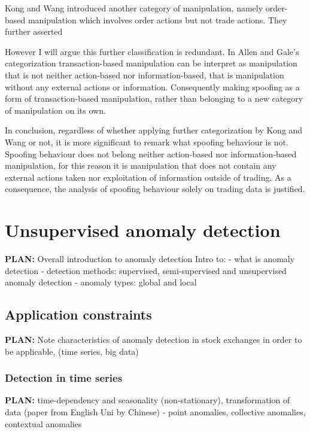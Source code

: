 \documentclass{tut-thesis}
\begin{document}
Kong and Wang \cite*{KongWang2013} introduced another category of manipulation, namely order-based manipulation which involves order actions but not trade actions. They further asserted 

However I will argue this further classification is redundant. In Allen and Gale's categorization transaction-based manipulation can be interpret as manipulation that is not neither action-based nor information-based, that is manipulation without any external actions or information. Consequently making spoofing as a form of transaction-based manipulation, rather than belonging to a new category of manipulation on its own.

In conclusion, regardless of whether applying further categorization by Kong and Wang or not, it is more significant to remark what spoofing behaviour is not. Spoofing behaviour does not belong neither action-based nor information-based manipulation, for this reason it is manipulation that does not contain any external actions taken nor exploitation of information outside of trading. As a consequence, the analysis of spoofing behaviour solely on trading data is justified.



\chapter{Unsupervised anomaly detection}
\textbf{PLAN:} Overall introduction to anomaly detection
Intro to:
- what is anomaly detection
- detection methods: supervised, semi-supervised and unsupervised anomaly detection
- anomaly types: global and local

\section{Application constraints}
\textbf{PLAN:} Note characteristics of anomaly detection in stock exchanges in order to be applicable, (time series, big data)

\subsection{Detection in time series}
\textbf{PLAN:} time-dependency and seasonality (non-stationary), transformation of data (paper from English Uni by Chinese)
- point anomalies, collective anomalies, contextual anomalies
\end{document}
